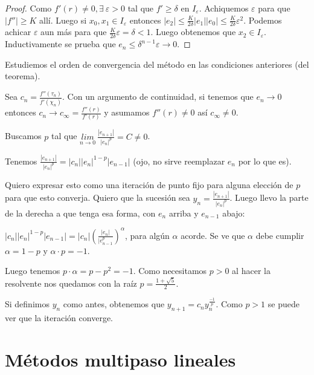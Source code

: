 \documentclass[10pt,a4paper,final]{report}
\begin{document}
{\begin{proof}
	Como $f'(r) \neq 0, \exists\ \varepsilon>0$ tal que $f' \geq \delta$ en $I_\varepsilon$. Achiquemos $\varepsilon$ para que $|f''| \geq K$ allí. Luego si $x_0,x_1 \in I_\varepsilon$ entonces $|e_2| \leq \frac{K}{2 \delta} |e_1| |e_0| \leq \frac{K}{2 \delta} \varepsilon^2$. Podemos achicar $\varepsilon$ aun más para que $\frac{K}{2 \delta} \varepsilon = \delta < 1$. Luego obtenemos que $x_2 \in I_\varepsilon$.\\

Inductivamente se prueba que $e_n \leq \delta^{n-1} \varepsilon \to 0$.
\end{proof}

Estudiemos el orden de convergencia del método en las condiciones anteriores (del teorema).

Sea $c_n =  \frac{f''(\tau_n)}{f'(\chi_n)}$. Con un argumento de continuidad, si tenemos que $e_n \to 0$ entonces $c_n \to c_\infty = \frac{f''(r)}{f'(r)}$ y asumamos $f''(r) \neq 0$ así $c_\infty \neq 0$. \bigskip

Buscamos $p$ tal que $\underset{n\to 0}{lim}\ \frac{|e_{n+1}|}{|e_n|^p}=C \neq 0$.

Tenemos $\frac{|e_{n+1}|}{|e_n|^p} = |c_n| |e_n|^{1-p} |e_{n-1}|$ (ojo, no sirve reemplazar $e_n$ por lo que es).

Quiero expresar esto como una iteración de punto fijo para alguna elección de $p$ para que esto converja. Quiero que la sucesión sea $y_n = \frac{|e_{n+1}|}{|e_n|^p}$. Luego llevo la parte de la derecha a que tenga esa forma, con $e_n$ arriba y $e_{n-1}$ abajo:




$|c_n| |e_n|^{1-p} |e_{n-1}| = |c_n| (\frac{|e_n|}{|e_{n-1}^p})^\alpha$, para algún $\alpha$ acorde. Se ve que $\alpha$ debe cumplir $\alpha = 1-p$ y $\alpha\cdot p = -1$.

Luego tenemos $p\cdot\alpha = p - p^2 = -1$. Como necesitamos $p>0$ al hacer la resolvente nos quedamos con la raíz $p=\frac{1+\sqrt{5}}{2}$.

Si definimos $y_n$ como antes, obtenemos que $y_{n+1} = c_n y_n^{\frac{-1}{p}}$. Como $p>1$ se puede ver que la iteración converge.%

\section{Métodos multipaso lineales}

}
\end{document}
